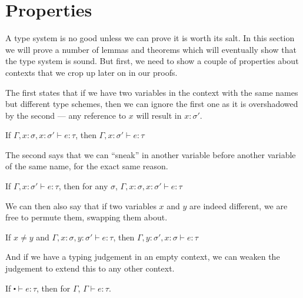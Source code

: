 \chapter{Properties}\label{cha:properties}
A type system is no good unless we can prove it is worth its salt. In
this section we will prove a number of lemmas and theorems which will
eventually show that the type system is sound. But first, we need to
show a couple of properties about contexts that we crop up later on
in our proofs.

The first states that if we have two variables in the context with the
same names but different type schemes, then we can ignore the first
one as it is overshadowed by the second --- any reference to $x$ will
result in $x : \sigma'$.
\begin{lemma}[Drop]\label{lem:drop}
  If $\Gamma , x : \sigma, x : \sigma' \vdash e : \tau$, then $\Gamma , x : \sigma' \vdash e : \tau$
\end{lemma}
The second says that we can ``sneak'' in another variable before another
variable of the same name, for the exact same reason.
\begin{lemma}[Sneak]\label{lem:sneak}
  If $\Gamma , x : \sigma' \vdash e : \tau$, then for any $\sigma$, $\Gamma , x : \sigma, x : \sigma' \vdash e : \tau$
\end{lemma}
We can then also say that if two variables $x$ and $y$ are indeed
different, we are free to permute them, swapping them about.
\begin{lemma}[Swap]\label{lem:swap}
  If $x \neq y$ and $\Gamma , x : \sigma, y : \sigma' \vdash e : \tau$, then $\Gamma , y : \sigma' , x : \sigma \vdash e
  : \tau$
\end{lemma}
And if we have a typing judgement in an empty context, we can weaken
the judgement to extend this to any other context.
\begin{lemma}[Weaken]\label{lem:weaken}
  If $\centerdot \vdash e : \tau$, then for $\Gamma$, $\Gamma \vdash e : \tau$.
\end{lemma}

